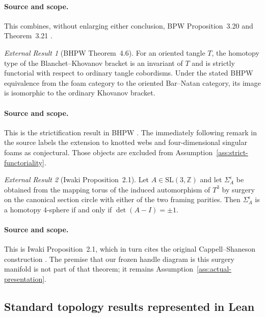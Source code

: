 \documentclass[10pt,reqno]{amsart}
\theoremstyle{definition}
\theoremstyle{remark}
\newtheorem{externalresult}{External Result}
\newcommand{\Z}{\mathbb Z}
\begin{document}
\paragraph{Source and scope.}
This combines, without enlarging either conclusion, BPW Proposition~3.20 and
Theorem~3.21 \cite[Proposition~3.20 and Theorem~3.21]{BPW2018}.

\begin{externalresult}[BHPW Theorem~4.6]\label{prop:bhpw}
For an oriented tangle $T$, the homotopy type of the Blanchet--Khovanov
bracket is an invariant of $T$ and is strictly functorial with respect to
ordinary tangle cobordisms.  Under the stated BHPW equivalence from the foam
category to the oriented Bar--Natan category, its image is isomorphic to the
ordinary Khovanov bracket.
\end{externalresult}

\paragraph{Source and scope.}
This is the strictification result in BHPW
\cite[Theorem~4.6]{BHPW2023}.  The immediately following remark in the source
labels the extension to knotted webs and four-dimensional singular foams as
conjectural.  Those objects are excluded from Assumption~\ref{ass:strict-functoriality}.

\begin{externalresult}[Iwaki Proposition~2.1]\label{prop:cs-criterion}
Let $A\in\mathrm{SL}(3,\Z)$ and let $\Sigma_A^\epsilon$ be obtained from the
mapping torus of the induced automorphism of $T^3$ by surgery on the canonical
section circle with either of the two framing parities.  Then
$\Sigma_A^\epsilon$ is a homotopy $4$-sphere if and only if
$\det(A-I)=\pm1$.
\end{externalresult}

\paragraph{Source and scope.}
This is Iwaki Proposition~2.1, which in turn cites the original
Cappell--Shaneson construction \cite[Proposition~2.1]{Iwaki2025}.  The premise
that our frozen handle diagram is this surgery manifold is not part of that
theorem; it remains Assumption~\ref{ass:actual-presentation}.

\subsection{Standard topology results represented in Lean}
\end{document}
